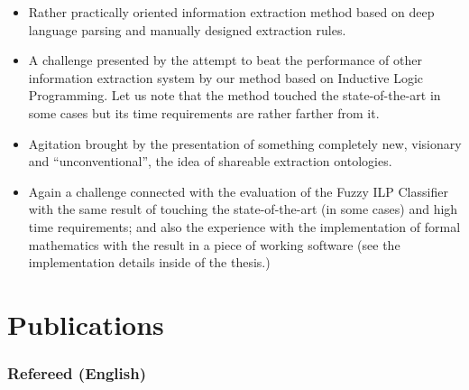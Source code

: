 \documentclass[12pt,a4paper,twoside,notitlepage]{article}
\begin{document}
\begin{itemize}
	\item Rather practically oriented information extraction method based on deep language parsing and manually designed extraction rules.

	\item A challenge presented by the attempt to beat the performance of other information extraction system by our method based on Inductive Logic Programming.  Let us note that the method touched the state-of-the-art in some cases but its time requirements are rather farther from it.

	\item Agitation brought by the presentation of something completely new, visionary and ``unconventional'', the idea of shareable extraction ontologies.

	\item Again a challenge connected with the evaluation of the Fuzzy ILP Classifier with the same result of touching the state-of-the-art (in some cases) and high time requirements; and also the experience with the implementation of formal mathematics with the result in a piece of working software (see the implementation details inside of the thesis.)
\end{itemize}







\newpage

\section*{Publications} \label{sec:my_publications}

\subsubsection*{Refereed (English)}
\end{document}
